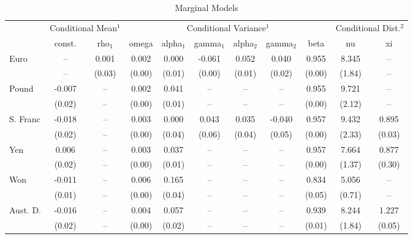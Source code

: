 \documentclass[12pt]{article}
\begin{document}
\begin{landscape}

\begin{table}
\caption{Marginal Models}
\begin{threeparttable}
	\begin{tabular}[l]{l c c | c c c c c c | c c}
\hline \hline
& \multicolumn{2}{c}{Conditional Mean$^{1}$} & \multicolumn{6}{c}{Conditional Variance$^{1}$} & \multicolumn{2}{c}{Conditional Dist.$^{2}$} \\
         & const. & rho$_{1}$ & omega  & alpha$_{1}$ & gamma$_{1}$ & alpha$_{2}$ & gamma$_{2}$ & beta   & nu     & xi     \\
\hline
Euro     & --     &  0.001    & 0.002  & 0.000       & -0.061      & 0.052       & 0.040       & 0.955  & 8.345  & --     \\
         & --     & (0.03)    & (0.00) & (0.01)      & (0.00)      & (0.01)      & (0.02)      & (0.00) & (1.84) & --     \\
Pound    & -0.007 & --        & 0.002  & 0.041       & --          & --          & --          & 0.955  & 9.721  & --     \\
         & (0.02) & --        & (0.00) & (0.01)      & --          & --          & --          & (0.00) & (2.12) & --     \\
S. Franc & -0.018 & --        & 0.003  & 0.000       & 0.043       & 0.035       & -0.040      & 0.957  & 9.432  & 0.895  \\
		 & (0.02) & --        & (0.00) & (0.04)      & (0.06)      & (0.04)      & (0.05)      & (0.00) & (2.33) & (0.03) \\
Yen      & 0.006  & --        & 0.003  & 0.037       & --          & --          & --          & 0.957  & 7.664  & 0.877  \\
         & (0.02) & --        & (0.00) & (0.01)      & --          & --          & --          & (0.00) & (1.37) & (0.30) \\
Won      & -0.011 & --        & 0.006  & 0.165       & --          & --          & --          & 0.834  & 5.056  & --     \\
         & (0.01) & --        & (0.00) & (0.04)      & --          & --          & --          & (0.05) & (0.71) & --     \\
Aust. D. & -0.016 & --        & 0.004  & 0.057       & --          & --          & --          & 0.939  & 8.244  & 1.227  \\
         & (0.02) & --        & (0.00) & (0.02)      & --          & --          & --          & (0.01) & (1.84) & (0.05) \\

\end{tabular}
\end{threeparttable}
\end{table}
\end{landscape}
\end{document}
